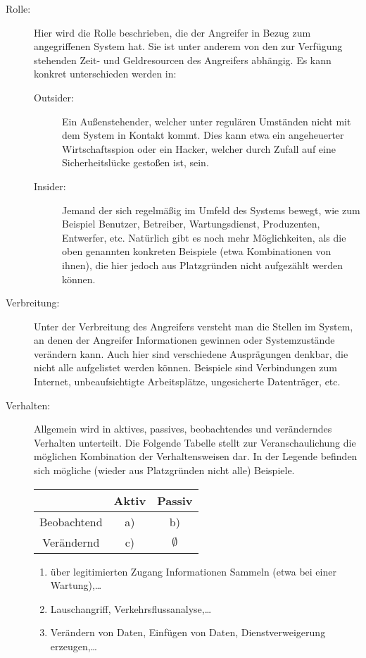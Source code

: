 \documentclass[ngerman]{fbi-aufgabenblatt}
\begin{document}
\begin{description}
	\item[Rolle:] Hier wird die Rolle beschrieben, die der Angreifer in Bezug zum angegriffenen System hat. Sie ist unter anderem von den zur Verfügung stehenden Zeit- und Geldresourcen des Angreifers abhängig. Es kann konkret unterschieden werden in:
	
	\begin{description}
		\item[Outsider:] Ein Außenstehender, welcher unter regulären Umständen nicht mit dem System in Kontakt kommt. Dies kann etwa ein angeheuerter Wirtschaftsspion oder ein Hacker, welcher durch Zufall auf eine Sicherheitslücke gestoßen ist, sein.
		\item[Insider:] Jemand der sich regelmäßig im Umfeld des Systems bewegt, wie zum Beispiel Benutzer, Betreiber, Wartungsdienst, Produzenten, Entwerfer, etc. Natürlich gibt es noch mehr Möglichkeiten, als die oben genannten konkreten Beispiele (etwa Kombinationen von ihnen), die hier jedoch aus Platzgründen nicht aufgezählt werden können.
	\end{description}
	\item[Verbreitung:] Unter der Verbreitung des Angreifers versteht man die Stellen im System, an denen der Angreifer Informationen gewinnen oder Systemzustände verändern kann. Auch hier sind verschiedene Ausprägungen denkbar, die nicht alle aufgelistet werden können. Beispiele sind Verbindungen zum Internet, unbeaufsichtigte Arbeitsplätze, ungesicherte Datenträger, etc.
	\item[Verhalten:] Allgemein wird in aktives, passives, beobachtendes und veränderndes Verhalten unterteilt. Die Folgende Tabelle stellt zur Veranschaulichung die möglichen Kombination der Verhaltensweisen dar. In der Legende befinden sich mögliche (wieder aus Platzgründen nicht alle) Beispiele.

	\begin{center}
		\begin{tabular}{|c|c|c|}
			\hline
			& Aktiv & Passiv \\ \hline
			Beobachtend & a) & b) \\ \hline
			Verändernd & c) & $\emptyset$ \\ \hline
		\end{tabular}
	\end{center} 

	\begin{enumerate}
		\item über legitimierten Zugang Informationen Sammeln (etwa bei einer 	Wartung),\dots
		\item Lauschangriff, Verkehrsflussanalyse,\dots
		\item Verändern von Daten, Einfügen von Daten, Dienstverweigerung 	erzeugen,\dots
	\end{enumerate}


\end{description}
\end{document}
